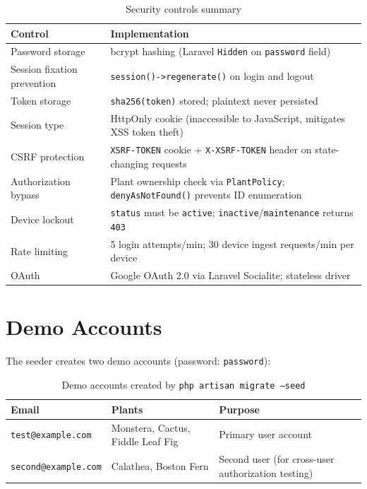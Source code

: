 \documentclass[11pt,a4paper]{article}
\begin{document}
\begin{table}[h]
\centering
\small
\begin{tabular}{p{4cm}p{7cm}}
\toprule
\textbf{Control} & \textbf{Implementation} \\
\midrule
Password storage & bcrypt hashing (Laravel \texttt{Hidden} on \texttt{password} field) \\
Session fixation prevention & \texttt{session()->regenerate()} on login and logout \\
Token storage & \texttt{sha256(token)} stored; plaintext never persisted \\
Session type & HttpOnly cookie (inaccessible to JavaScript, mitigates XSS token theft) \\
CSRF protection & \texttt{XSRF-TOKEN} cookie + \texttt{X-XSRF-TOKEN} header on state-changing requests \\
Authorization bypass & Plant ownership check via \texttt{PlantPolicy}; \texttt{denyAsNotFound()} prevents ID enumeration \\
Device lockout & \texttt{status} must be \texttt{active}; \texttt{inactive}/\texttt{maintenance} returns \texttt{403} \\
Rate limiting & 5 login attempts/min; 30 device ingest requests/min per device \\
OAuth & Google OAuth 2.0 via Laravel Socialite; stateless driver \\
\midrule
\end{tabular}
\caption{Security controls summary}
\end{table}

\section{Demo Accounts}

The seeder creates two demo accounts (password: \texttt{password}):

\begin{table}[h]
\centering
\small
\begin{tabular}{lll}
\toprule
\textbf{Email} & \textbf{Plants} & \textbf{Purpose} \\
\midrule
\texttt{test@example.com} & Monstera, Cactus, Fiddle Leaf Fig & Primary user account \\
\texttt{second@example.com} & Calathea, Boston Fern & Second user (for cross-user authorization testing) \\
\bottomrule
\end{tabular}
\caption{Demo accounts created by \texttt{php artisan migrate --seed}}
\end{table}
\end{document}
